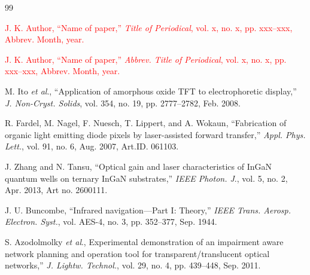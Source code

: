 \documentclass[11pt,a5paper,twoside]{article}
\begin{document}




\begin{thebibliography}{99}%

 \textcolor{red}{
	J. K. Author, ``Name of paper,'' \textit{Title of Periodical}, vol. x, no. x, pp. xxx--xxx, Abbrev. Month, year. 
	}


 \textcolor{red}{
J. K. Author, ``Name of paper,'' \textit{Abbrev. Title of Periodical}, vol. x, no. x, pp. xxx--xxx, Abbrev. Month, year. 
}


 M. Ito \textit{et al}., ``Application of amorphous oxide TFT to electrophoretic display,'' \textit{J. Non-Cryst. Solids}, vol. 354, no. 19, pp. 2777--2782, Feb. 2008. 

 R. Fardel, M. Nagel, F. Nuesch, T. Lippert, and A. Wokaun, ``Fabrication of organic light emitting diode pixels by laser-assisted forward transfer,'' \textit{Appl. Phys. Lett.}, vol. 91, no. 6, Aug. 2007, Art.ID. 061103. 

 J. Zhang and N. Tansu, ``Optical gain and laser characteristics of InGaN quantum wells on ternary InGaN substrates,'' \textit{IEEE Photon. J}., vol. 5, no. 2, Apr. 2013, Art no. 2600111. 

 J. U. Buncombe, ``Infrared navigation---Part I: Theory,'' \textit{IEEE Trans. Aerosp. Electron. Syst.}, vol. AES-4, 
no. 3, pp. 352--377, Sep. 1944.

 S. Azodolmolky \textit{et al}., Experimental demonstration of an impairment aware network planning and operation tool for transparent/translucent optical networks,'' \textit{J. Lightw. Technol.}, vol. 29, no. 4, pp. 439--448, Sep. 2011. 


\end{thebibliography}
\end{document}
